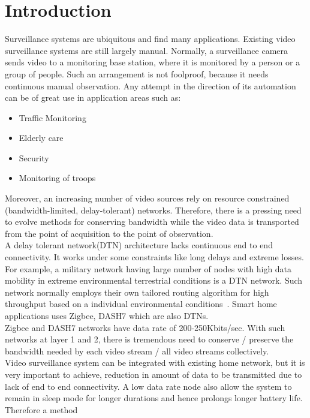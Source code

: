 
\chapter{Introduction} %
\label{Chapter1}
\indent Surveillance systems are ubiquitous and find many applications.
Existing video surveillance systems are still largely manual.
Normally, a surveillance camera sends video to a monitoring base
station, where it is monitored by a person or a group of people. Such an
arrangement is not foolproof, because it needs continuous manual
observation.  Any attempt in the direction of its automation can be of
great use in application areas such as:
\begin{itemize}
	 \item  Traffic Monitoring
	  \item Elderly care
	    \item Security
	    \item Monitoring of troops
\end{itemize}
\indent Moreover, an increasing number of video sources rely on resource
constrained (bandwidth-limited, delay-tolerant) networks.  Therefore,
there is a pressing need to evolve methods for conserving bandwidth
while the video data is transported from the point of acquisition to the
point of observation.\\ 
\indent A delay tolerant network(DTN) architecture lacks continuous end
to end connectivity. It works under some constraints like long delays
and extreme losses. For example, a military network having large number
of nodes with high data mobility in extreme environmental terrestrial
conditions is a DTN network. Such network normally employs their own
tailored routing algorithm for high throughput based on a individual
environmental conditions~\cite{1}. Smart home applications uses Zigbee,
DASH7 which are also DTNs.\\
\indent Zigbee and DASH7 networks have data rate of 200-250Kbits/sec.
With such networks at layer 1 and 2, there is tremendous need to conserve /
preserve the bandwidth needed by each video stream / all video streams
collectively.\\
\indent Video surveillance system can be integrated with existing home
network, but it is very important to achieve, reduction in amount of
data to be transmitted due to lack of end to end connectivity. A low
data rate node also allow the system to remain in sleep mode for longer
durations and hence prolongs longer battery life. Therefore a method
